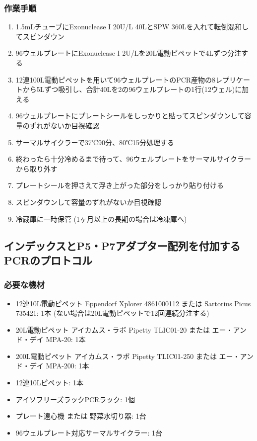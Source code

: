 \documentclass[titlepage,10pt,a4paper,uplatex]{jsbook}
\begin{document}
\subsubsection{作業手順}
\begin{enumerate}
\item 1.5mLチューブにExonuclease I 20U/{\textmu}L 40{\textmu}LとSPW 360{\textmu}Lを入れて転倒混和してスピンダウン
\item 96ウェルプレートにExonuclease I 2U/{\textmu}Lを20{\textmu}L電動ピペットで4{\textmu}Lずつ分注する
\item 12連100{\textmu}L電動ピペットを用いて96ウェルプレートのPCR産物の8レプリケートから5{\textmu}Lずつ吸引し、合計40{\textmu}Lを2の96ウェルプレートの1行(12ウェル)に加える
\item 96ウェルプレートにプレートシールをしっかりと貼ってスピンダウンして容量のずれがないか目視確認
\item サーマルサイクラーで37℃90分、80℃15分処理する
\item 終わったら十分冷めるまで待って、96ウェルプレートをサーマルサイクラーから取り外す
\item プレートシールを押さえて浮き上がった部分をしっかり貼り付ける
\item スピンダウンして容量のずれがないか目視確認
\item 冷蔵庫に一時保管 (1ヶ月以上の長期の場合は冷凍庫へ)
\end{enumerate}

\subsection{インデックスとP5・P7アダプター配列を付加するPCRのプロトコル}

\subsubsection{必要な機材}
\begin{itemize}
\item 12連10{\textmu}L電動ピペット Eppendorf Xplorer 4861000112 または Sartorius Picus 735421: 1本 (ない場合は20{\textmu}L電動ピペットで12回連続分注する)
\item 20{\textmu}L電動ピペット アイカムス・ラボ Pipetty TLIC01-20 または エー・アンド・デイ MPA-20: 1本
\item 200{\textmu}L電動ピペット アイカムス・ラボ Pipetty TLIC01-250 または エー・アンド・デイ MPA-200: 1本
\item 12連10{\textmu}Lピペット: 1本
\item アイソフリーズラックPCRラック: 1個
\item プレート遠心機 または 野菜水切り器: 1台
\item 96ウェルプレート対応サーマルサイクラー: 1台
\end{itemize}
\end{document}
